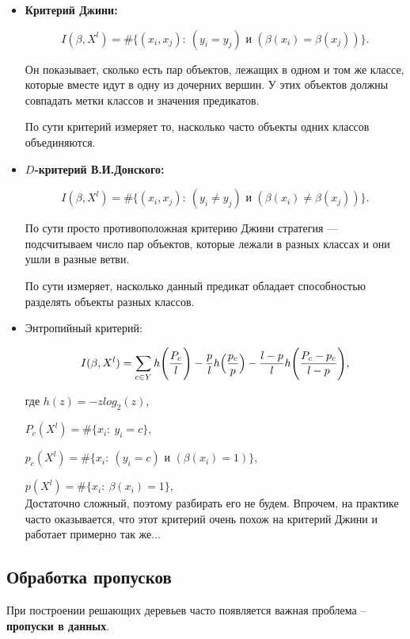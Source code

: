 \documentclass{article}
\begin{document}
\begin{itemize}
\item \textbf{Критерий Джини:}

$$I(\beta, X^l) = \#\{(x_i, x_j):\ (y_i = y_j) \text{ и } (\beta(x_i) = \beta(x_j))\}.$$

Он показывает, сколько есть пар объектов, лежащих в одном и том же классе, которые вместе идут в одну из дочерних вершин. У этих объектов должны совпадать метки классов и значения предикатов.

По сути критерий измеряет то, насколько часто объекты одних классов объединяются.

\item $D$\textbf{-критерий В.И.Донского:}

$$I(\beta, X^l) = \#\{(x_i, x_j):\ (y_i \not=y_j) \text{ и } (\beta(x_i) \not= \beta(x_j))\}.$$

По сути просто противоположная критерию Джини стратегия --- подсчитываем число пар объектов, которые лежали в разных классах и они ушли в разные ветви.

По сути измеряет, насколько данный предикат обладает способностью разделять объекты разных классов.

\item Энтропийный критерий:

$$I(\beta, X^l) = 
\sum\limits_{c \in Y} h\Biggl(\frac{P_c}{l}\Biggr)
- \frac{p}{l}h\Bigl(\frac{p_c}{p}\Bigr)
- \frac{l - p}{l}h\Biggl(\frac{P_c - p_c}{l - p}\Biggr),$$

где $h(z) = -z log_2(z)$,

$P_c(X^l) = \#\{x_i:\ y_i = c\}$,

$p_c(X^l) = \#\{x_i:\ (y_i = c) \text{ и } (\beta(x_i) = 1)\}$,

$p(X^l) = \#\{x_i:\ \beta(x_i) = 1\}$,
\\

Достаточно сложный, поэтому разбирать его не будем. Впрочем, на практике часто оказывается, что этот критерий очень похож на критерий Джини и работает примерно так же...

\end{itemize}

\subsection{Обработка пропусков}

При построении решающих деревьев часто появляется важная проблема -- \textbf{пропуски в данных}.
\end{document}
